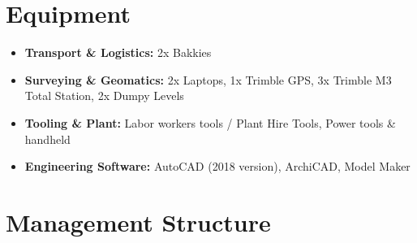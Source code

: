 \documentclass[a4paper,11pt]{article}
\providecommand{\faCogs}{\faCog}
\begin{document}
\newpage


\section{Equipment}

\begin{tcolorbox}[
  enhanced, colback=white, colframe=awenMaroon, 
  boxrule=0.8pt, arc=4pt, top=10pt, bottom=10pt, left=12pt, right=12pt
]
\begin{itemize}[label=\textcolor{awenGold}{\faCogs}, itemsep=6pt, font=\color{awenDarkGrey}]
  \item \textbf{Transport \& Logistics:} 2x Bakkies
  \item \textbf{Surveying \& Geomatics:} 2x Laptops, 1x Trimble GPS, 3x Trimble M3 Total Station, 2x Dumpy Levels
  \item \textbf{Tooling \& Plant:} Labor workers tools / Plant Hire Tools, Power tools \& handheld
  \item \textbf{Engineering Software:} AutoCAD (2018 version), ArchiCAD, Model Maker
\end{itemize}
\end{tcolorbox}

\vspace{0.6cm}

\section{Management Structure}
\end{document}
